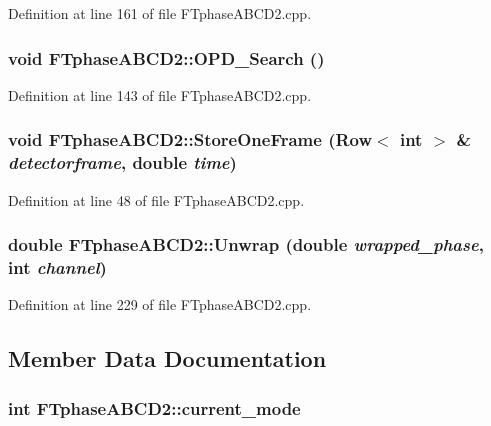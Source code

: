 Definition at line 161 of file FTphaseABCD2.cpp.

\hypertarget{classFTphaseABCD2_a3cf90485f77c81b1006c06896d066786}{
\subsubsection[{OPD\_\-Search}]{\setlength{\rightskip}{0pt plus 5cm}void FTphaseABCD2::OPD\_\-Search ()}}
\label{classFTphaseABCD2_a3cf90485f77c81b1006c06896d066786}


Definition at line 143 of file FTphaseABCD2.cpp.

\hypertarget{classFTphaseABCD2_aa6c06992bf50c3b129f07d6e6ecc72a3}{
\subsubsection[{StoreOneFrame}]{\setlength{\rightskip}{0pt plus 5cm}void FTphaseABCD2::StoreOneFrame ({\bf Row}$<$ int $>$ \& {\em detectorframe}, \/  double {\em time})}}
\label{classFTphaseABCD2_aa6c06992bf50c3b129f07d6e6ecc72a3}


Definition at line 48 of file FTphaseABCD2.cpp.

\hypertarget{classFTphaseABCD2_ae26e64b229a3e52ac7238ec7d95419c1}{
\subsubsection[{Unwrap}]{\setlength{\rightskip}{0pt plus 5cm}double FTphaseABCD2::Unwrap (double {\em wrapped\_\-phase}, \/  int {\em channel})}}
\label{classFTphaseABCD2_ae26e64b229a3e52ac7238ec7d95419c1}


Definition at line 229 of file FTphaseABCD2.cpp.



\subsection{Member Data Documentation}
\hypertarget{classFTphaseABCD2_a72a86ecdac2805373d411e60237f5184}{
\subsubsection[{current\_\-mode}]{\setlength{\rightskip}{0pt plus 5cm}int {\bf FTphaseABCD2::current\_\-mode}}}
\label{classFTphaseABCD2_a72a86ecdac2805373d411e60237f5184}


